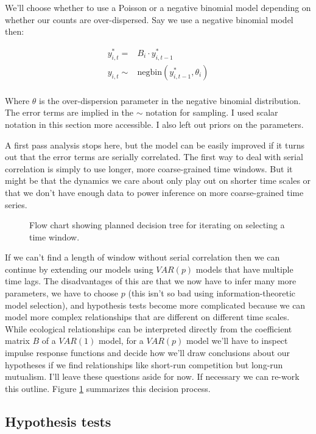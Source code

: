 \documentclass[12pt]{memoir}
\begin{document}
We'll choose whether to use a Poisson or a negative binomial model depending on whether our counts are over-dispersed.  Say we use a negative binomial model then:

\begin{align*}
  y^*_{i,t} = & B_i \cdot y^*_{i,t-1} \\
  y_{i,t} \sim & \mathrm{negbin}(y^*_{i,t-1}, \theta_{i}) \\
\end{align*}

Where $\theta$ is the over-dispersion parameter in the negative binomial distribution.  The error terms are implied in the $\sim$ notation for sampling. I used scalar notation in this section more accessible.  I also left out priors on the parameters.

A first pass analysis stops here, but the model can be easily improved if it turns out that the error terms are serially correlated.  The first way to deal with serial correlation is simply to use longer, more coarse-grained time windows. But it might be that the dynamics we care about only play out on shorter time scales or that we don't have enough data to power inference on more coarse-grained time series.

\begin{figure}[t]
  
  \caption{Flow chart showing planned decision tree for iterating on selecting a time window. \label{fig:analytic_plan}}
\end{figure}

If we can't find a length of window without serial correlation then we can continue by extending our models using $VAR(p)$ models that have multiple time lags. The disadvantages of this are that we now have to infer many more parameters, we have to choose $p$ (this isn't so bad using information-theoretic model selection), and hypothesis tests become more complicated because we can model more complex relationships that are different on different time scales. While ecological relationships can be interpreted directly from the coefficient matrix $B$ of a $VAR(1)$ model, for a $VAR(p)$ model we'll have to inspect impulse response functions and decide how we'll draw conclusions about our hypotheses if we find relationships like short-run competition but long-run mutualism.  I'll leave these questions aside for now.  If necessary we can re-work this outline. Figure \ref{fig:analytic_plan} summarizes this decision process.

\subsection{Hypothesis tests}
\label{sec:hypothesis_tests}
\end{document}
